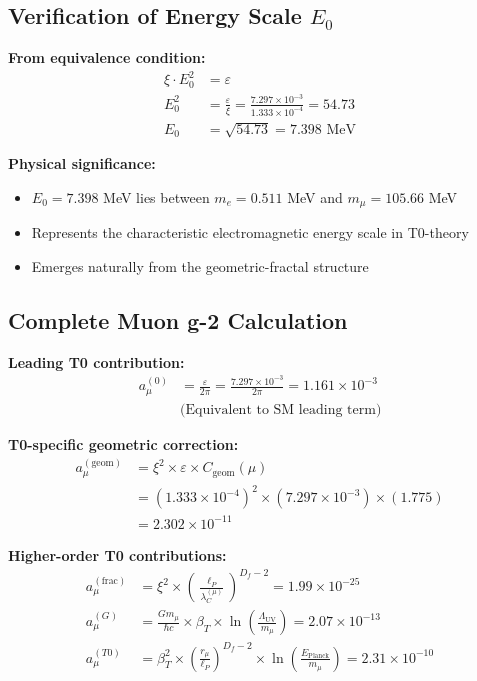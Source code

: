 \documentclass[12pt,a4paper]{article}
\numberwithin{equation}{section}
\newcommand{\xipar}{\xi}
\newcommand{\epsilonT}{\varepsilon}
\newcommand{\Cgeom}{C_{\text{geom}}}
\newcommand{\Df}{D_f}
\newcommand{\Eo}{E_0}
\newcommand{\lP}{\ell_P}
\newcommand{\lambdaC}{\lambda_C}
\begin{document}
	\subsection{Verification of Energy Scale $\Eo$}
	
	\textbf{From equivalence condition:}
	\begin{align}
		\xipar \cdot \Eo^2 &= \epsilonT\\
		\Eo^2 &= \frac{\epsilonT}{\xipar} = \frac{7.297 \times 10^{-3}}{1.333 \times 10^{-4}} = 54.73\\
		\Eo &= \sqrt{54.73} = 7.398 \text{ MeV}
		\label{eq:e0_verification}
	\end{align}
	
	\textbf{Physical significance:}
	\begin{itemize}
		\item $\Eo = 7.398$ MeV lies between $m_e = 0.511$ MeV and $m_\mu = 105.66$ MeV
		\item Represents the characteristic electromagnetic energy scale in T0-theory
		\item Emerges naturally from the geometric-fractal structure
	\end{itemize}
	
	\subsection{Complete Muon g-2 Calculation}
	
	\textbf{Leading T0 contribution:}
	\begin{align}
		a_\mu^{(0)} &= \frac{\epsilonT}{2\pi} = \frac{7.297 \times 10^{-3}}{2\pi} = 1.161 \times 10^{-3}\\
		&\text{(Equivalent to SM leading term)}
		\label{eq:muon_leading}
	\end{align}
	
	\textbf{T0-specific geometric correction:}
	\begin{align}
		a_\mu^{(\text{geom})} &= \xipar^2 \times \epsilonT \times \Cgeom(\mu)\\
		&= (1.333 \times 10^{-4})^2 \times (7.297 \times 10^{-3}) \times (1.775)\\
		&= 2.302 \times 10^{-11}
		\label{eq:muon_geometric}
	\end{align}
	
	\textbf{Higher-order T0 contributions:}
	\begin{align}
		a_\mu^{(\text{frac})} &= \xipar^2 \times \left(\frac{\lP}{\lambdaC^{(\mu)}}\right)^{\Df-2} = 1.99 \times 10^{-25}\\
		a_\mu^{(G)} &= \frac{G m_\mu}{\hbar c} \times \beta_T \times \ln\left(\frac{\Lambda_{\text{UV}}}{m_\mu}\right) = 2.07 \times 10^{-13}\\
		a_\mu^{(T0)} &= \beta_T^2 \times \left(\frac{r_\mu}{\lP}\right)^{\Df-2} \times \ln\left(\frac{E_{\text{Planck}}}{m_\mu}\right) = 2.31 \times 10^{-10}
		\label{eq:muon_higher_order}
	\end{align}
	
\end{document}
